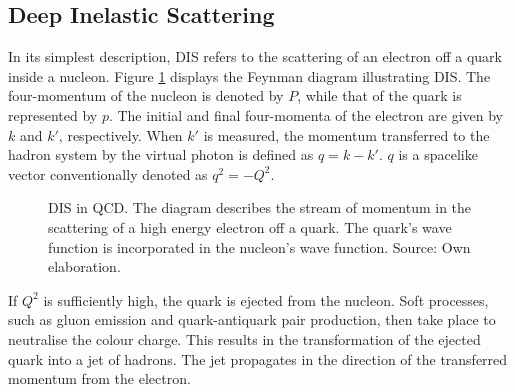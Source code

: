 \subsection{Deep Inelastic Scattering} \label{sec::dis}
    In its simplest description, DIS refers to the scattering of an electron off a quark inside a nucleon.
    Figure \ref{fig::dis_diagram} displays the Feynman diagram illustrating DIS.
    The four-momentum of the nucleon is denoted by $P$, while that of the quark is represented by $p$.
    The initial and final four-momenta of the electron are given by $k$ and $k'$, respectively.
    When $k'$ is measured, the momentum transferred to the hadron system by the virtual photon is defined as $q = k - k'$.
    $q$ is a spacelike vector conventionally denoted as $q^2 = -Q^2$.

    \begin{figure}[h!]
        \centering{}
        \caption[DIS in QCD.]{DIS in QCD. The diagram describes the stream of momentum in the scattering of a high energy electron off a quark. The quark's wave function is incorporated in the nucleon's wave function. Source: Own elaboration.}
        \label{fig::dis_diagram}
    \end{figure}

    If $Q^2$ is sufficiently high, the quark is ejected from the nucleon.
    Soft processes, such as gluon emission and quark-antiquark pair production, then take place to neutralise the colour charge.
    This results in the transformation of the ejected quark into a jet of hadrons.
    The jet propagates in the direction of the transferred momentum from the electron.

